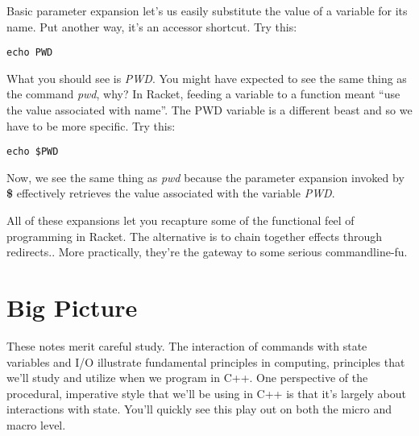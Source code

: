 \documentclass[nobib]{tufte-handout}
\begin{document}
Basic parameter expansion let's us easily substitute the value of a variable for its name. Put another way, it's an accessor shortcut. Try this:
\begin{verbatim}
echo PWD
\end{verbatim}
What you should see is \textit{PWD}.  You might have expected to see the same thing as the command \textit{pwd}, why? In Racket, feeding a variable to a function meant ``use the value associated with name''.  The PWD variable is a different beast and so we have to be more specific. Try this:
\begin{verbatim}
echo $PWD
\end{verbatim}
Now, we see the same thing as \textit{pwd} because the parameter expansion invoked by \textbf{\$} effectively retrieves the value associated with the variable \textit{PWD}.

All of these expansions let you recapture some of the functional feel of programming in Racket.  The alternative is to chain together effects through redirects..  More practically, they're the gateway to some serious commandline-fu.


\section{Big Picture}

These notes merit careful study. The interaction of commands with state variables and I/O illustrate fundamental principles in computing, principles that we'll study and utilize when we program in C++. One perspective of the procedural, imperative style that we'll be using in C++ is that it's largely about interactions with state. You'll quickly see this play out on both the micro and macro level.
\end{document}
